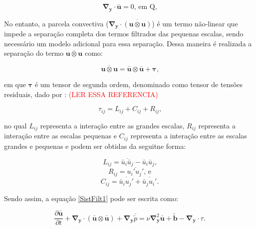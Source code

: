 \documentclass[_ArquivoPrincipal.tex]{subfiles}
\begin{document}
\begin{equation}
    \mathbf{\nabla}_\mathbf{y}\cdot\bar{\mathbf{u}}=0\text{, em }\mathrm{Q}\text{,}
    \label{SistFilt2}
\end{equation}

No entanto, a parcela convectiva ($\mathbf{\nabla}_\mathbf{y}\cdot\overline{(\mathbf{u}\otimes\mathbf{u})}$) é um termo não-linear que impede a separação completa dos termos filtrados das pequenas escalas, sendo necessário um modelo adicional para essa separação. Dessa maneira é realizada a separação do termo $\overline{\mathbf{u}\otimes\mathbf{u}}$ como:

\begin{equation}
    \overline{\mathbf{u}\otimes\mathbf{u}}=\bar{\mathbf{u}}\otimes\bar{\mathbf{u}}+\mathbf{\tau}\text{,}
    \label{Sep2}
\end{equation}

\noindent em que $\mathbf{\tau}$ é um tensor de segunda ordem, denominado como tensor de tensões residuais, dado por \cite{leonard1975energy}: \textcolor{red}{(LER ESSA REFERENCIA)}

\begin{equation}
    \tau_{ij}=L_{ij}+C_{ij}+R_{ij}\text{,}
    \label{TensRes}
\end{equation}

\noindent no qual $L_{ij}$ representa a interação entre as grandes escalas, $R_{ij}$ representa a interação entre as escalas pequenas e $C_{ij}$ representa a interação entre as escalas grandes e pequenas e podem ser obtidas da seguitne forma:

\begin{equation}
    L_{ij}=\overline{\bar{u}_i\bar{u}_j}-\bar{u}_i\bar{u}_j\text{,}
    \label{Lij}
\end{equation}
\begin{equation}
    R_{ij}=\overline{u_i'u_j'}\text{, e}
    \label{Cij}
\end{equation}
\begin{equation}
    C_{ij}=\overline{\bar{u}_iu_j'}+\overline{\bar{u}_ju_i'}\text{.}
    \label{Rij}
\end{equation}

Sendo assim, a equação \ref{SistFilt1} pode ser escrita como:

\begin{equation}
    \frac{\partial\bar{\mathbf{u}}}{\partial t}+\mathbf{\nabla}_\mathbf{y}\cdot{(\bar{\mathbf{u}}\otimes\bar{\mathbf{u}})}+\mathbf{\nabla}_\mathbf{y}\bar{\tilde{p}}=\nu\mathbf{\nabla}^2_\mathbf{y}\bar{\mathbf{u}}+\tilde{\mathbf{b}}-\mathbf{\nabla}_\mathbf{y}\cdot\tau\text{.}
    \label{EqFiltrada}
\end{equation}
\end{document}
